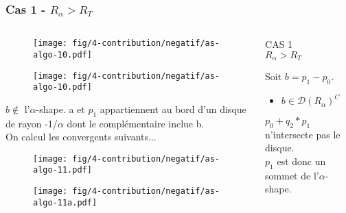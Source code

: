 \begin{frame}
  \frametitle{Cas 1 - $R_{\alpha} > R_T$}
\begin{columns}[t]
   \begin{column}{7cm}
      {
        \begin{figure}[H]
          \centering
          \texttt{[image: fig/4-contribution/negatif/as-algo-10.pdf]}
      \end{figure}
      }
      {
        \begin{figure}[H]
          \centering
          \texttt{[image: fig/4-contribution/negatif/as-algo-10.pdf]}
       \end{figure}
      }
      {
          \begin{block}{$b \notin$ l'$\alpha$-shape.}
          	a et $p_1$ appartiennent au bord d'un disque de rayon -1/$\alpha$ dont le complémentaire inclue b.\\
          \alert{On calcul les convergents suivants...}
        \end{block}
      }   
      {
        \begin{figure}[H]
          \centering
          \texttt{[image: fig/4-contribution/negatif/as-algo-11.pdf]}
      \end{figure}
      }
      {
        \begin{figure}[H]
          \centering
          \texttt{[image: fig/4-contribution/negatif/as-algo-11a.pdf]}
      \end{figure}
      }
   \end{column}
    \begin{column}{3cm}
      \begin{block}{}
        {
          \alert{CAS 1}\\
          \alert{$R_{\alpha} > R_T$}
          
        }
        {
          Soit $b = p_{1} - p_{0}$.
          \begin{itemize}
            \item $b \in \mathcal{D} \left( R_{\alpha} \right)^C$
          \end{itemize}
        }        
        {
					$p_{0} + q_2 * p_1$ n'intersecte pas le disque.\\
				  $p_{1}$ est donc un sommet de l'$\alpha$-shape.			

}
\end{block}
\end{column}
\end{columns}
\end{frame}
